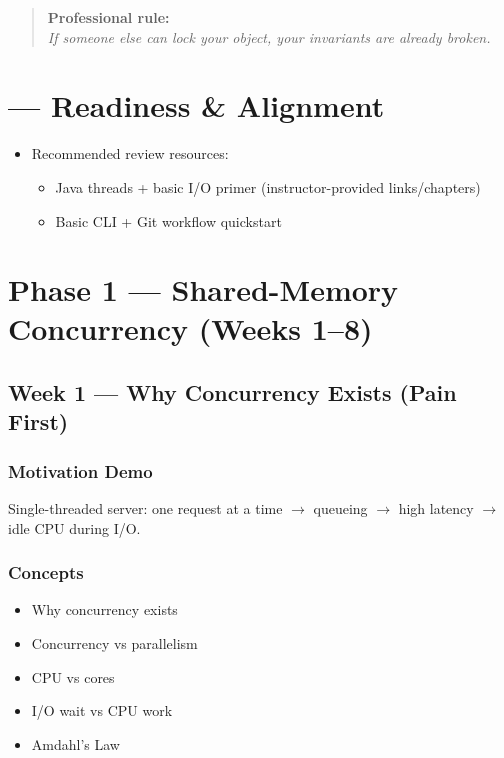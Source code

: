 \documentclass[11pt,a4paper]{article}
\begin{document}
	
	\begin{quote}
		\textbf{Professional rule:}\\
		\textit{If someone else can lock your object, your invariants are already broken.}
	\end{quote}
	
	\section*{ --- Readiness \& Alignment}
	

	\begin{itemize}[leftmargin=*]

		\item Recommended review resources:
		\begin{itemize}[leftmargin=*]
			\item Java threads + basic I/O primer (instructor-provided links/chapters)
			\item Basic CLI + Git workflow quickstart
		\end{itemize}
	\end{itemize}
	
	\section*{Phase 1 --- Shared-Memory Concurrency (Weeks 1--8)}
	
	\subsection*{Week 1 --- Why Concurrency Exists (Pain First)}
	
	\subsubsection*{Motivation Demo}
	Single-threaded server: one request at a time $\rightarrow$ queueing $\rightarrow$ high latency $\rightarrow$ idle CPU during I/O.
	
	\subsubsection*{Concepts}
	\begin{itemize}[leftmargin=*]
		\item Why concurrency exists
		\item Concurrency vs parallelism
		\item CPU vs cores
		\item I/O wait vs CPU work
		\item Amdahl's Law 
	\end{itemize}
	
\end{document}
